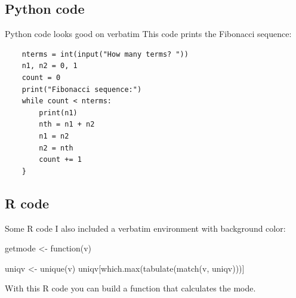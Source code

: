 \subsection{Python code}

\begin{frame}[fragile]{Python code looks good on verbatim}
	This code prints the Fibonacci sequence:
	\begin{verbatim}
	nterms = int(input("How many terms? "))
	n1, n2 = 0, 1
	count = 0
	print("Fibonacci sequence:")
	while count < nterms:
	    print(n1)
	    nth = n1 + n2
	    n1 = n2
	    n2 = nth
	    count += 1
	}
	\end{verbatim}
\end{frame}

\subsection{R code}

\begin{frame}[fragile]{Some R code}
I also included a verbatim environment with background color:
	\begin{cverbatim}
getmode <- function(v) {
  uniqv <- unique(v)
  uniqv[which.max(tabulate(match(v, uniqv)))]
  
}
	\end{cverbatim}
	With this R code you can build a function that calculates the mode.
\end{frame}




